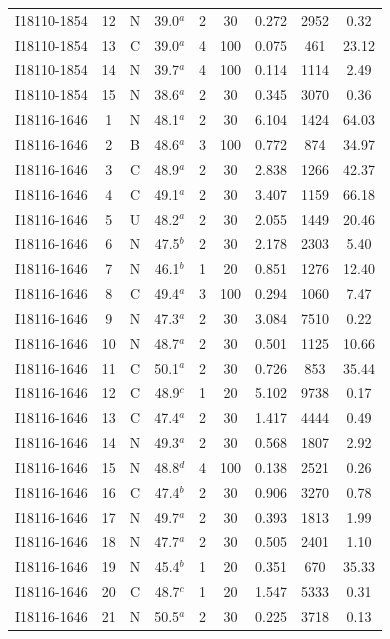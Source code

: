 \begin{table}
\begin{tabular}{ccccccccc}
I18110-1854 & 12 & N & 39.0$^{a}$ & 2 & 30 & 0.272 & 2952 & 0.32 \\
I18110-1854 & 13 & C & 39.0$^{a}$ & 4 & 100 & 0.075 & 461 & 23.12 \\
I18110-1854 & 14 & N & 39.7$^{a}$ & 4 & 100 & 0.114 & 1114 & 2.49 \\
I18110-1854 & 15 & N & 38.6$^{a}$ & 2 & 30 & 0.345 & 3070 & 0.36 \\
I18116-1646 & 1 & N & 48.1$^{a}$ & 2 & 30 & 6.104 & 1424 & 64.03 \\
I18116-1646 & 2 & B & 48.6$^{a}$ & 3 & 100 & 0.772 & 874 & 34.97 \\
I18116-1646 & 3 & C & 48.9$^{a}$ & 2 & 30 & 2.838 & 1266 & 42.37 \\
I18116-1646 & 4 & C & 49.1$^{a}$ & 2 & 30 & 3.407 & 1159 & 66.18 \\
I18116-1646 & 5 & U & 48.2$^{a}$ & 2 & 30 & 2.055 & 1449 & 20.46 \\
I18116-1646 & 6 & N & 47.5$^{b}$ & 2 & 30 & 2.178 & 2303 & 5.40 \\
I18116-1646 & 7 & N & 46.1$^{b}$ & 1 & 20 & 0.851 & 1276 & 12.40 \\
I18116-1646 & 8 & C & 49.4$^{a}$ & 3 & 100 & 0.294 & 1060 & 7.47 \\
I18116-1646 & 9 & N & 47.3$^{a}$ & 2 & 30 & 3.084 & 7510 & 0.22 \\
I18116-1646 & 10 & N & 48.7$^{a}$ & 2 & 30 & 0.501 & 1125 & 10.66 \\
I18116-1646 & 11 & C & 50.1$^{a}$ & 2 & 30 & 0.726 & 853 & 35.44 \\
I18116-1646 & 12 & C & 48.9$^{c}$ & 1 & 20 & 5.102 & 9738 & 0.17 \\
I18116-1646 & 13 & C & 47.4$^{a}$ & 2 & 30 & 1.417 & 4444 & 0.49 \\
I18116-1646 & 14 & N & 49.3$^{a}$ & 2 & 30 & 0.568 & 1807 & 2.92 \\
I18116-1646 & 15 & N & 48.8$^{d}$ & 4 & 100 & 0.138 & 2521 & 0.26 \\
I18116-1646 & 16 & C & 47.4$^{b}$ & 2 & 30 & 0.906 & 3270 & 0.78 \\
I18116-1646 & 17 & N & 49.7$^{a}$ & 2 & 30 & 0.393 & 1813 & 1.99 \\
I18116-1646 & 18 & N & 47.7$^{a}$ & 2 & 30 & 0.505 & 2401 & 1.10 \\
I18116-1646 & 19 & N & 45.4$^{b}$ & 1 & 20 & 0.351 & 670 & 35.33 \\
I18116-1646 & 20 & C & 48.7$^{c}$ & 1 & 20 & 1.547 & 5333 & 0.31 \\
I18116-1646 & 21 & N & 50.5$^{a}$ & 2 & 30 & 0.225 & 3718 & 0.13 \\

\end{tabular}
\end{table}
